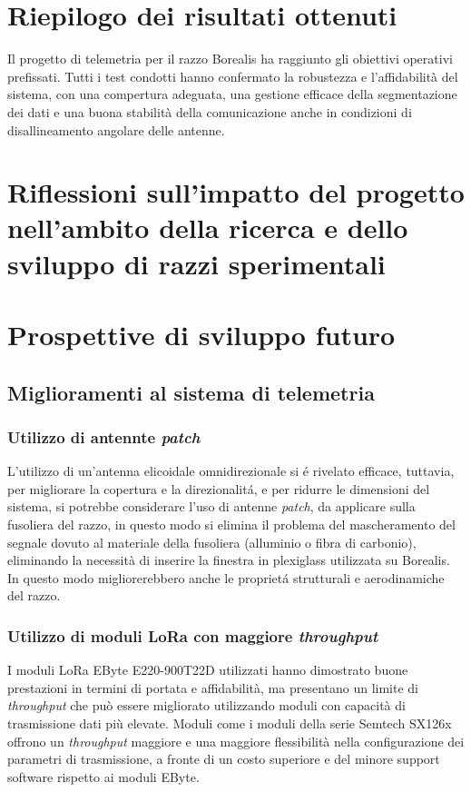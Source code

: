 \documentclass[12pt,a4paper,twoside]{book}
\begin{document}
\section{Riepilogo dei risultati ottenuti}
Il progetto di telemetria per il razzo Borealis ha raggiunto gli obiettivi operativi prefissati. 
Tutti i test condotti hanno confermato la robustezza e l'affidabilità del sistema, 
con una compertura adeguata, una gestione efficace della segmentazione dei dati 
e una buona stabilità della comunicazione anche in condizioni di disallineamento angolare
delle antenne.

\section{Riflessioni sull'impatto del progetto nell'ambito della ricerca e dello sviluppo di razzi sperimentali}

\section{Prospettive di sviluppo futuro}
\subsection{Miglioramenti al sistema di telemetria}
\subsubsection{Utilizzo di antennte \emph{patch}}
L'utilizzo di un'antenna elicoidale omnidirezionale si \'e rivelato efficace, tuttavia, 
per migliorare la copertura e la direzionalit\'a, e per ridurre le dimensioni del sistema, 
si potrebbe considerare l'uso di antenne \emph{patch}, da applicare sulla fusoliera del razzo, 
in questo modo si elimina il problema del mascheramento del segnale dovuto al materiale della fusoliera 
(alluminio o fibra di carbonio), eliminando la necessità di inserire la finestra in plexiglass utilizzata 
su Borealis. In questo modo migliorerebbero anche le propriet\'a strutturali e aerodinamiche del razzo.
\subsubsection{Utilizzo di moduli \ac{LoRa} con maggiore \emph{throughput}}
I moduli \ac{LoRa} EByte E220-900T22D utilizzati hanno dimostrato buone prestazioni
in termini di portata e affidabilità, ma presentano un limite di \emph{throughput} che
può essere migliorato utilizzando moduli con capacità di trasmissione dati più elevate.
Moduli come i moduli della serie Semtech SX126x offrono un \emph{throughput} maggiore e 
una maggiore flessibilità nella configurazione dei parametri di trasmissione, a fronte 
di un costo superiore e del minore support software rispetto ai moduli EByte.
\end{document}
